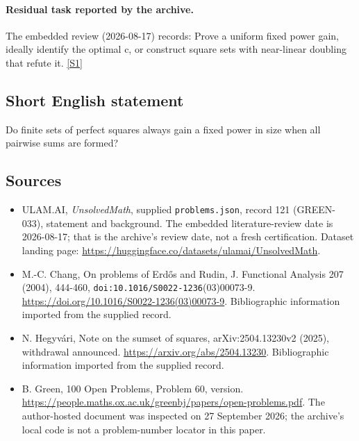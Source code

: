 \documentclass[11pt,a4paper]{article}
\newcommand{\sref}[2]{\hyperlink{source:#1:#2}{[S#2]}}
\begin{document}
\paragraph{Residual task reported by the archive.}

The embedded review (2026-08-17) records: Prove a uniform fixed power gain, ideally identify the optimal c, or construct square sets with near-linear doubling that refute it. \sref{121}{1}

\subsection{Short English statement}

Do finite sets of perfect squares always gain a fixed power in size when all pairwise sums are formed?

\subsection{Sources}

{\small

\begin{itemize}

\item[\hypertarget{source:121:1}{S1}] ULAM.AI, \emph{UnsolvedMath}, supplied \texttt{problems.json}, record 121 (GREEN-033), statement and background. The embedded literature-review date is 2026-08-17; that is the archive’s review date, not a fresh certification. Dataset landing page: \url{https://huggingface.co/datasets/ulamai/UnsolvedMath}.

\item[\hypertarget{source:121:2}{S2}] M.-C. Chang, On problems of Erdős and Rudin, J. Functional Analysis 207 (2004), 444-460, \nolinkurl{doi:10.1016/S0022-1236}(03)00073-9. \url{https://doi.org/10.1016/S0022-1236(03)00073-9}. Bibliographic information imported from the supplied record.

\item[\hypertarget{source:121:3}{S3}] N. Hegyvári, Note on the sumset of squares, arXiv:2504.13230v2 (2025), withdrawal announced. \url{https://arxiv.org/abs/2504.13230}. Bibliographic information imported from the supplied record.

\item[\hypertarget{source:121:4}{S4}] B. Green, 100 Open Problems, Problem 60, version. \url{https://people.maths.ox.ac.uk/greenbj/papers/open-problems.pdf}. The author-hosted document was inspected on 27 September 2026; the archive’s local code is not a problem-number locator in this paper.

\end{itemize}

}

\label{end:121}
\end{document}

